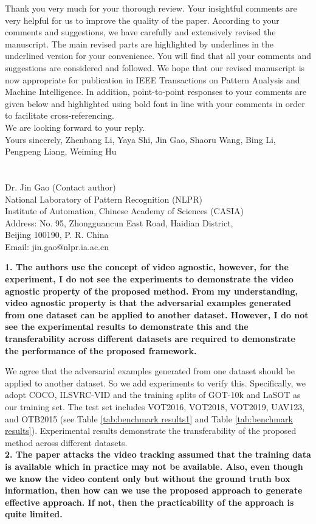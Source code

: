 \documentclass[12pt]{article}
\begin{document}
Thank you very much for your thorough review. Your insightful comments are very helpful for us to improve the quality of the paper. According to your comments and suggestions, we have carefully and extensively revised the manuscript. The main revised parts are highlighted by underlines in the underlined version for your convenience. You will find that all your comments and suggestions are considered and followed. We hope that our revised manuscript is now appropriate for publication in IEEE Transactions on Pattern Analysis and Machine Intelligence.
In addition, point-to-point responses to your comments are given below and highlighted using bold font in line with your comments in order to facilitate cross-referencing.\\[10pt]
\indent We are looking forward to your reply.\\[10pt]
\noindent Yours sincerely,
\noindent Zhenbang Li, Yaya Shi, Jin Gao, Shaoru Wang, Bing Li, Pengpeng Liang, Weiming Hu
\\
\\
\\
\noindent Dr. Jin Gao (Contact author)\\
\noindent National Laboratory of Pattern Recognition (NLPR)\\
\noindent Institute of Automation, Chinese Academy of Sciences (CASIA)\\
\noindent Address: No. 95, Zhongguancun East Road, Haidian District,\\
\noindent Beijing 100190, P. R. China\\
\noindent Email: jin.gao@nlpr.ia.ac.cn

\newpage
\textbf{1. The authors use the concept of video agnostic, however, for the experiment, I do not see the experiments to demonstrate the video agnostic property of the proposed method. From my understanding, video agnostic property is that the adversarial examples generated from one dataset can be applied to another dataset. However, I do not see the experimental results to demonstrate this and the transferability across different datasets are required to demonstrate the performance of the proposed framework.}

We agree that the adversarial examples generated from one dataset should be applied to another dataset. So we add experiments to verify this. Specifically, we adopt COCO, ILSVRC-VID and the training splits of GOT-10k and LaSOT as our training set. The test set includes VOT2016, VOT2018, VOT2019, UAV123, and OTB2015 (see Table \ref{tab:benchmark results1} and Table \ref{tab:benchmark results}).
Experimental results demonstrate the transferability of the proposed method across different datasets.
\\[6pt]
\noindent \textbf{2. The paper attacks the video tracking assumed that the training data is available which in practice may not be available. Also, even though we know the video content only but without the ground truth box information, then how can we use the proposed approach to generate effective approach. If not, then the practicability of the approach is quite limited.}
\end{document}
